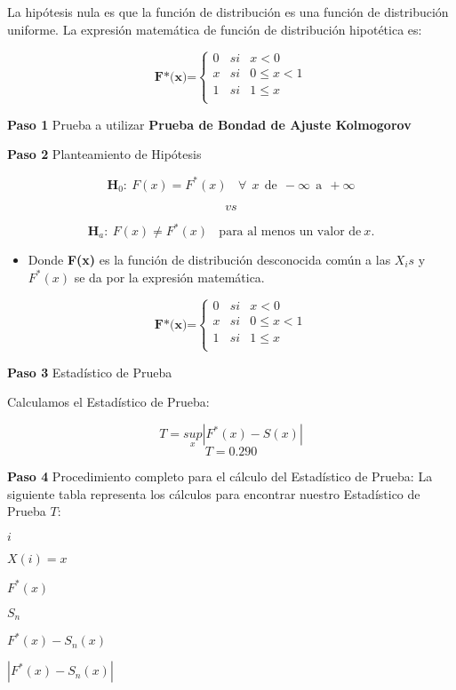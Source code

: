 \documentclass[
  a4paper,
  oneside,
  openany]{book}
\providecommand{\tightlist}{%
  \setlength{\itemsep}{0pt}\setlength{\parskip}{0pt}}
\begin{document}
La hipótesis nula es que la función de distribución es una función de distribución uniforme.
La expresión matemática de función de distribución hipotética es:

\[
\textbf{F*(x)=} \left\{
\begin{array}{lcc}
0 & si & x < 0 \\
x & si & 0 \leq x < 1 \\
1 & si & 1 \leq x \\
\end{array}
\right.
\]

\textbf{Paso 1} Prueba a utilizar \textbf{Prueba de Bondad de Ajuste Kolmogorov}

\textbf{Paso 2} Planteamiento de Hipótesis

\[\textbf{H}_0: \ F(x)=F^*(x) \ \ \ \ \forall \ \ x \ \ \mbox{de} \ \ -\infty \ \  \mbox{a} \ \  +\infty\]

\[vs\]

\[\textbf{H}_a: \ F(x) \neq F^*(x) \ \ \ \ \mbox{para al menos un  valor de} \  x.\]

\begin{itemize}
\tightlist
\item
  Donde \textbf{F(x)} es la función de distribución desconocida común a las \(X_{i}s\) y \(F^*(x)\) se da por la expresión matemática.
\end{itemize}

\[
\textbf{F*(x)=} \left\{
\begin{array}{lcc}
0 & si & x < 0 \\
x & si & 0 \leq x < 1 \\
1 & si & 1 \leq x \\
\end{array}
\right.
\]

\textbf{Paso 3} Estadístico de Prueba

Calculamos el Estadístico de Prueba:

\[T=\underset{x}{sup}|F^*(x)-S(x)|\]
\[T=0.290\]

\textbf{Paso 4} Procedimiento completo para el cálculo del Estadístico de Prueba:
La siguiente tabla representa los cálculos para encontrar nuestro Estadístico de Prueba \(T\):

\(i\)

\(X(i)=x\)

\(F^*(x)\)

\(S_n\)

\(F^*(x)-S_n(x)\)

\(|F^*(x)-S_n(x)|\)
\end{document}

